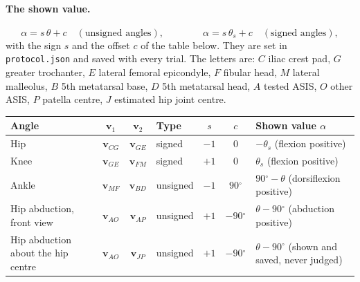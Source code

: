 \documentclass[a4paper,10pt]{article}
\newcommand{\code}[1]{\texttt{#1}}
\newcommand{\dg}{\ensuremath{^\circ}}
\begin{document}
\paragraph{The shown value.}
\begin{equation}\label{eq:alpha}
  \alpha=s\,\theta+c\quad(\text{unsigned angles}),\qquad\qquad \alpha=s\,\theta_s+c\quad(\text{signed angles}),
\end{equation}
with the sign $s$ and the offset $c$ of the table below. They are set in \code{protocol.json} and saved with every trial. The letters
are: $C$ iliac crest pad, $G$ greater trochanter, $E$ lateral femoral epicondyle, $F$ fibular head, $M$ lateral malleolus, $B$ 5th
metatarsal base, $D$ 5th metatarsal head, $A$ tested ASIS, $O$ other ASIS, $P$ patella centre, $J$ estimated hip joint centre.

\medskip
\begin{tabularx}{\linewidth}{@{}P{2.5cm}cclccL@{}}
\toprule
Angle & $\mathbf{v}_1$ & $\mathbf{v}_2$ & Type & $s$ & $c$ & Shown value $\alpha$ \\
\midrule
Hip & $\mathbf{v}_{CG}$ & $\mathbf{v}_{GE}$ & signed & $-1$ & $0$ & $-\theta_s$ (flexion positive) \\
Knee & $\mathbf{v}_{GE}$ & $\mathbf{v}_{FM}$ & signed & $+1$ & $0$ & $\theta_s$ (flexion positive) \\
Ankle & $\mathbf{v}_{MF}$ & $\mathbf{v}_{BD}$ & unsigned & $-1$ & $90\dg$ & $90\dg-\theta$ (dorsiflexion positive) \\
Hip abduction, front view & $\mathbf{v}_{AO}$ & $\mathbf{v}_{AP}$ & unsigned & $+1$ & $-90\dg$ & $\theta-90\dg$ (abduction positive) \\
Hip abduction about the hip centre & $\mathbf{v}_{AO}$ & $\mathbf{v}_{JP}$ & unsigned & $+1$ & $-90\dg$ & $\theta-90\dg$ (shown and saved, never judged) \\
\bottomrule
\end{tabularx}
\end{document}
